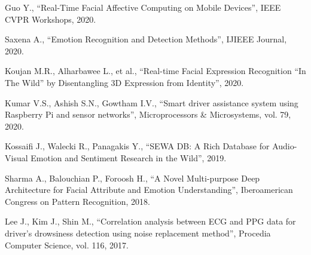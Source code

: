 \documentclass[conference]{IEEEtran}
\begin{document}
\begin{enumerate}[label={[\arabic*]}, leftmargin=*, itemsep=4pt]
    \item Guo Y., ``Real-Time Facial Affective Computing on Mobile Devices'', IEEE CVPR Workshops, 2020.
    \item Saxena A., ``Emotion Recognition and Detection Methods'', IJIEEE Journal, 2020.
    \item Koujan M.R., Alharbawee L., et al., ``Real-time Facial Expression Recognition ``In The Wild'' by Disentangling 3D Expression from Identity'', 2020.
    \item Kumar V.S., Ashish S.N., Gowtham I.V., ``Smart driver assistance system using Raspberry Pi and sensor networks'', Microprocessors \& Microsystems, vol. 79, 2020.
    \item Kossaifi J., Walecki R., Panagakis Y., ``SEWA DB: A Rich Database for Audio-Visual Emotion and Sentiment Research in the Wild'', 2019.
    \item Sharma A., Balouchian P., Foroosh H., ``A Novel Multi-purpose Deep Architecture for Facial Attribute and Emotion Understanding'', Iberoamerican Congress on Pattern Recognition, 2018.
    \item Lee J., Kim J., Shin M., ``Correlation analysis between ECG and PPG data for driver’s drowsiness detection using noise replacement method'', Procedia Computer Science, vol. 116, 2017.
\end{enumerate}
\end{document}
